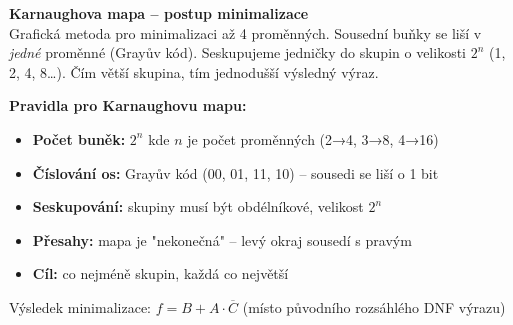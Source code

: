 \documentclass[a4paper,10pt]{article}
\begin{document}
\begin{vysvetlenibox}
\textbf{Karnaughova mapa -- postup minimalizace}\\
Grafická metoda pro minimalizaci až 4 proměnných.
Sousední buňky se liší v \textit{jedné} proměnné (Grayův kód).
Seskupujeme jedničky do skupin o velikosti $2^n$ (1, 2, 4, 8\ldots).
Čím větší skupina, tím jednodušší výsledný výraz.

\textbf{Pravidla pro Karnaughovu mapu:}
\begin{itemize}[noitemsep, leftmargin=1.4em, topsep=4pt]
    \item \textbf{Počet buněk:} $2^n$ kde $n$ je počet proměnných (2→4, 3→8, 4→16)
    \item \textbf{Číslování os:} Grayův kód (00, 01, 11, 10) -- sousedi se liší o 1 bit
    \item \textbf{Seskupování:} skupiny musí být obdélníkové, velikost $2^n$
    \item \textbf{Přesahy:} mapa je "nekonečná" -- levý okraj sousedí s pravým
    \item \textbf{Cíl:} co nejméně skupin, každá co největší
\end{itemize}

\begin{center}
\end{center}

\begin{vzorcebox}
Výsledek minimalizace: $f = B + A \cdot \overline{C}$
\quad (místo původního rozsáhlého DNF výrazu)
\end{vzorcebox}


\end{vysvetlenibox}
\end{document}
